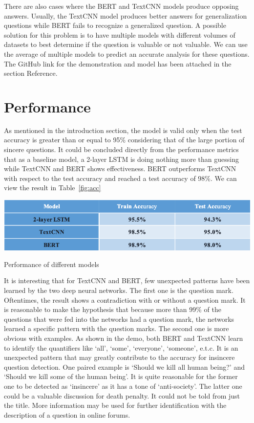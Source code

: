\documentclass{article}
\begin{document}
There are also cases where the BERT and TextCNN models produce opposing answers. Usually, the TextCNN model produces better answers for generalization questions while BERT fails to recognize a generalized question. A possible solution for this problem is to have multiple models with different volumes of datasets to best determine if the question is valuable or not valuable. We can use the average of multiple models to predict an accurate analysis for these questions. The GitHub link for the demonstration and model has been attached in the section Reference.

\section{Performance}
As mentioned in the introduction section, the model is valid only when the test accuracy is greater than or equal to 95\% considering that of the large portion of sincere questions. It could be concluded directly from the performance metrics that as a baseline model, a 2-layer LSTM is doing nothing more than guessing while TextCNN and BERT shows effectiveness. BERT outperforms TextCNN with respect to the test accuracy and reached a test accuracy of 98\%. We can view the result in Table~\ref{fig:acc}

\begin{table}[h!]
	\centering
	\includegraphics[scale=0.8]{acc.png}
	\caption{Performance of different models}
	\label{fig:acc}
\end{table}

It is interesting that for TextCNN and BERT, few unexpected patterns have been learned by the two deep neural networks. The first one is the question mark. Oftentimes, the result shows a contradiction with or without a question mark. It is reasonable to make the hypothesis that because more than 99\% of the questions that were fed into the networks had a question mark, the networks learned a specific pattern with the question marks. The second one is more obvious with examples. As shown in the demo, both BERT and TextCNN learn to identify the quantifiers like ‘all’, ‘some’, ‘everyone’, ‘someone’, e.t.c. It is an unexpected pattern that may greatly contribute to the accuracy for insincere question detection. One paired example is ‘Should we kill all human being?’ and ‘Should we kill some of the human being’. It is quite reasonable for the former one to be detected as ‘insincere’ as it has a tone of ‘anti-society’. The latter one could be a valuable discussion for death penalty. It could not be told from just the title. More information may be used for further identification with the description of a question in online forums.
\end{document}
